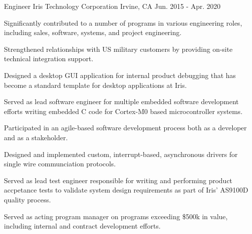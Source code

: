\begin{cventries}
  \cventry
    {Engineer} %
    {Iris Technology Corporation} %
    {Irvine, CA} %
    {Jun. 2015 - Apr. 2020} %
    {
      \begin{cvitems} %
        \item {Significantly contributed to a number of programs in various engineering roles, including sales, software, systems, and project engineering.}
        \item {Strengthened relationships with US military customers by providing on-site technical integration support.}
        \item {Designed a desktop GUI application for internal product debugging that has become a standard template for desktop applications at Iris.}
        \item {Served as lead software engineer for multiple embedded software development efforts writing embedded C code for Cortex-M0 based microcontroller systems.}
        \item {Participated in an agile-based software development process both as a developer and as a stakeholder.}
        \item {Designed and implemented custom, interrupt-based, asynchronous drivers for single wire communciation protocols.}
        \item {Served as lead test engineer responsible for writing and performing product accpetance tests to validate system design requirements as part of Iris' AS9100D quality process.}
        \item {Served as acting program manager on programs exceeding \$500k in value, including internal and contract development efforts.}
      \end{cvitems}
    }

\end{cventries}
